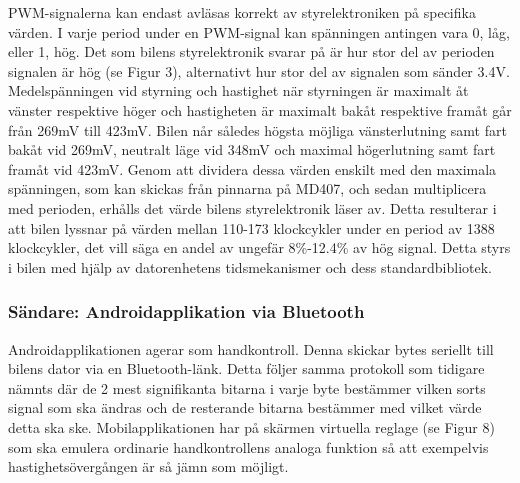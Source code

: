 \documentclass[a4paper]{article}
\begin{document}
\vspace{5mm} \noindent
PWM-signalerna kan endast avläsas korrekt av styrelektroniken på specifika värden. I varje period under en PWM-signal kan spänningen antingen vara 0, låg, eller 1, hög. Det som bilens styrelektronik svarar på är hur stor del av perioden signalen är hög (se Figur 3),  alternativt hur stor del av signalen som sänder 3.4V. Medelspänningen vid styrning och hastighet när styrningen är maximalt åt vänster respektive höger och hastigheten är maximalt bakåt respektive framåt går från 269mV till 423mV. Bilen når således högsta möjliga vänsterlutning samt fart bakåt vid 269mV, neutralt läge vid 348mV och maximal högerlutning samt fart framåt vid 423mV. Genom att dividera dessa värden enskilt med den maximala spänningen, som kan skickas från pinnarna på MD407, och sedan multiplicera med perioden, erhålls det värde bilens styrelektronik läser av. Detta resulterar i att bilen lyssnar på värden mellan 110-173 klockcykler under en period av 1388 klockcykler, det vill säga en andel av ungefär 8\%-12.4\% av hög signal. Detta styrs i bilen med hjälp av datorenhetens tidsmekanismer och dess standardbibliotek.

\subsubsection{Sändare: Androidapplikation via Bluetooth}
Androidapplikationen agerar som handkontroll. Denna skickar bytes seriellt till bilens dator via en Bluetooth-länk. Detta följer samma protokoll som tidigare nämnts där de 2 mest signifikanta bitarna i varje byte bestämmer vilken sorts signal som ska ändras och de resterande bitarna bestämmer med vilket värde detta ska ske. Mobilapplikationen har på skärmen virtuella reglage (se Figur 8) som ska emulera ordinarie handkontrollens analoga funktion så att exempelvis hastighetsövergången är så jämn som möjligt.
\end{document}
